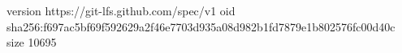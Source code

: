 version https://git-lfs.github.com/spec/v1
oid sha256:f697ac5bf69f592629a2f46e7703d935a08d982b1fd7879e1b802576fc00d40c
size 10695
